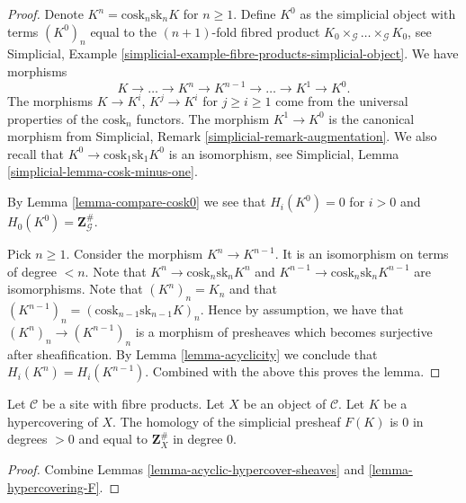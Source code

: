 \begin{proof}
Denote $K^n = \text{cosk}_n \text{sk}_n K$ for $n \geq 1$.
Define $K^0$ as the simplicial object with terms
$(K^0)_n$ equal to the $(n + 1)$-fold fibred product
$K_0 \times_\mathcal{G} \ldots \times_\mathcal{G} K_0$,
see Simplicial,
Example \ref{simplicial-example-fibre-products-simplicial-object}.
We have morphisms
$$
K \longrightarrow \ldots \to K^n \to K^{n - 1} \to \ldots \to K^1 \to K^0.
$$
The morphisms $K \to K^i$, $K^j \to K^i$ for $j \geq i \geq 1$ come
from the universal properties of the $\text{cosk}_n$ functors.
The morphism $K^1 \to K^0$ is the canonical morphism
from
Simplicial, Remark \ref{simplicial-remark-augmentation}.
We also recall that $K^0 \to \text{cosk}_1 \text{sk}_1 K^0$
is an isomorphism, see
Simplicial, Lemma \ref{simplicial-lemma-cosk-minus-one}.

\medskip\noindent
By Lemma \ref{lemma-compare-cosk0} we see that
$H_i(K^0) = 0$ for $i > 0$ and $H_0(K^0) = \mathbf{Z}_\mathcal{G}^\#$.

\medskip\noindent
Pick $n \geq 1$. Consider the morphism $K^n \to K^{n - 1}$.
It is an isomorphism on terms of degree $< n$.
Note that $K^n \to \text{cosk}_n \text{sk}_n K^n$ and
$K^{n - 1} \to \text{cosk}_n \text{sk}_n K^{n - 1}$
are isomorphisms. Note that $(K^n)_n = K_n$ and
that $(K^{n - 1})_n = (\text{cosk}_{n - 1} \text{sk}_{n - 1} K)_n$.
Hence by assumption, we have that $(K^n)_n \to (K^{n - 1})_n$
is a morphism of presheaves which becomes surjective after
sheafification. By Lemma \ref{lemma-acyclicity} we conclude that
$H_i(K^n) = H_i(K^{n - 1})$.
Combined with the above this proves the lemma.
\end{proof}

\begin{lemma}
\label{lemma-hypercovering-acyclic}
Let $\mathcal{C}$ be a site with fibre products.
Let $X$ be an object of $\mathcal{C}$.
Let $K$ be a hypercovering of $X$.
The homology of the simplicial presheaf $F(K)$ is
$0$ in degrees $> 0$ and equal to $\mathbf{Z}_X^\#$
in degree $0$.
\end{lemma}

\begin{proof}
Combine Lemmas \ref{lemma-acyclic-hypercover-sheaves}
and \ref{lemma-hypercovering-F}.
\end{proof}












